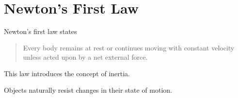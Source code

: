 \section{Newton's First Law}

Newton's first law states

\begin{quote}
	Every body remains at rest or continues moving with constant velocity unless
	acted upon by a net external force.
\end{quote}

This law introduces the concept of inertia.

Objects naturally resist changes in their state of motion.

